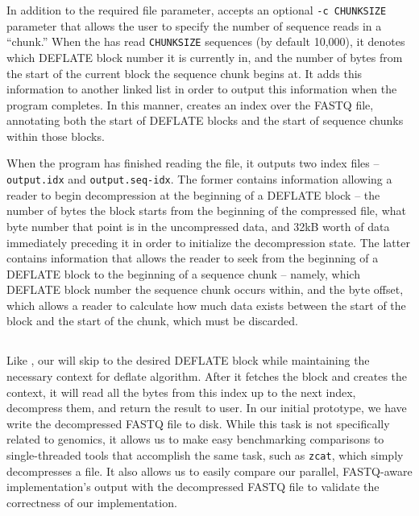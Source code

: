 In addition to the required \gzip file parameter, \ibuilder accepts an
optional \texttt{-c CHUNKSIZE} parameter that allows the user to specify the
number of sequence reads in a ``chunk.'' When the \ibuilder has read
\texttt{CHUNKSIZE} sequences (by default 10,000), it denotes which DEFLATE block
number it is currently in, and the number of bytes from the start of the current
block the sequence chunk begins at. It adds this information to another linked
list in order to output this information when the program completes. In this
manner, \ibuilder creates an index over the \gzip FASTQ file, annotating both
the start of \gzip DEFLATE blocks and the start of sequence chunks within those
blocks. 

When the \ibuilder program has finished reading the file, it outputs two index
files -- \texttt{output.idx} and \texttt{output.seq-idx}. The former contains
information allowing a reader to begin decompression at the beginning of a
DEFLATE block -- the number of bytes the block starts from the beginning of the
compressed file, what byte number that point is in the uncompressed data, and
32kB worth of data immediately preceding it in order to initialize the
decompression state. The latter contains information that allows the reader to
seek from the beginning of a DEFLATE block to the beginning of a sequence chunk
-- namely, which DEFLATE block number the sequence chunk occurs within, and the
byte offset, which allows a reader to calculate how much data exists between the
start of the block and the start of the chunk, which must be discarded.

\subsection{\ireader}
\label{sec:ireader}

Like \zran, our \ireader will skip to the desired DEFLATE block while
maintaining the necessary context for deflate algorithm. After it fetches the
block and creates the context, it will read all the bytes from this index up to
the next index, decompress them, and return the result to user. In our initial
prototype, we have \ireader write the decompressed FASTQ file to disk. While
this task is not specifically related to genomics, it allows us to make easy
benchmarking comparisons to single-threaded tools that accomplish the same task,
such as \texttt{zcat}, which simply decompresses a \gzip file. It also allows
us to easily compare our parallel, FASTQ-aware \ireader implementation's output
with the decompressed FASTQ file to validate the correctness of our
implementation.

